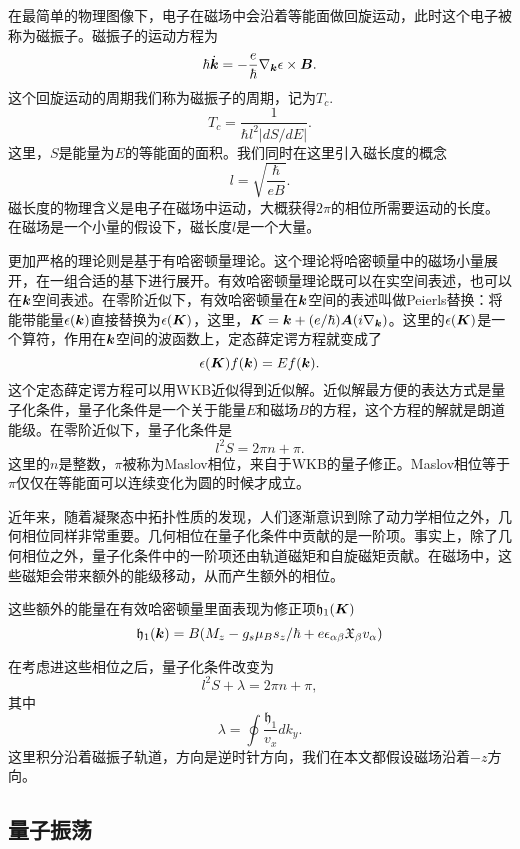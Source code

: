 在最简单的物理图像下，电子在磁场中会沿着等能面做回旋运动，此时这个电子被称为磁振子。磁振子的运动方程为
\begin{equation}
\hbar\dot{\boldsymbol{k}}=-\frac{e}{\hbar}\nabla_{\boldsymbol{k}}\epsilon\times\boldsymbol{B}.
\end{equation}
这个回旋运动的周期我们称为磁振子的周期，记为$T_c$.
\begin{equation}
T_c=\frac{1}{\hbar l^2 |dS/dE|}.
\end{equation}
这里，$S$是能量为$E$的等能面的面积。我们同时在这里引入磁长度的概念
\begin{equation}
l=\sqrt{\frac{\hbar}{eB}}.
\end{equation}
磁长度的物理含义是电子在磁场中运动，大概获得$2\pi$的相位所需要运动的长度。在磁场是一个小量的假设下，磁长度$l$是一个大量。


更加严格的理论则是基于有哈密顿量理论。这个理论将哈密顿量中的磁场小量展开，在一组合适的基下进行展开。有效哈密顿量理论既可以在实空间表述，也可以在$\boldsymbol{k}$空间表述。在零阶近似下，有效哈密顿量在$\boldsymbol{k}$空间的表述叫做Peierls替换：将能带能量$\epsilon(\boldsymbol{k})$直接替换为$\epsilon(\boldsymbol{K})$，这里，$\boldsymbol{K}=\boldsymbol{k}+(e/\hbar)\boldsymbol{A}(i\nabla_{\boldsymbol{k}})$。这里的$\epsilon(\boldsymbol{K})$是一个算符，作用在$\boldsymbol{k}$空间的波函数上，定态薛定谔方程就变成了
\begin{equation}
\epsilon(\boldsymbol{K})f(\boldsymbol{k})=Ef(\boldsymbol{k}).
\end{equation}
这个定态薛定谔方程可以用WKB近似得到近似解。近似解最方便的表达方式是量子化条件，量子化条件是一个关于能量$E$和磁场$B$的方程，这个方程的解就是朗道能级。在零阶近似下，量子化条件是
\begin{equation}
l^2 S=2\pi n+\pi.
\end{equation}
这里的$n$是整数，$\pi$被称为Maslov相位，来自于WKB的量子修正。Maslov相位等于$\pi$仅仅在等能面可以连续变化为圆的时候才成立。

近年来，随着凝聚态中拓扑性质的发现，人们逐渐意识到除了动力学相位之外，几何相位同样非常重要。几何相位在量子化条件中贡献的是一阶项。事实上，除了几何相位之外，量子化条件中的一阶项还由轨道磁矩和自旋磁矩贡献。在磁场中，这些磁矩会带来额外的能级移动，从而产生额外的相位。

这些额外的能量在有效哈密顿量里面表现为修正项$\mathfrak{h}_1(\boldsymbol{K})$
\begin{equation}
\mathfrak{h}_1(\boldsymbol{k})=B(M_z-g_s\mu_Bs_z/\hbar+e\epsilon_{\alpha\beta}\mathfrak{X}_\beta v_\alpha)
\end{equation}

在考虑进这些相位之后，量子化条件改变为
\begin{equation}
l^2 S+\lambda = 2\pi n +\pi,
\end{equation}
其中
\begin{equation}
\lambda = \oint \frac{\mathfrak{h}_1}{v_x} dk_y.
\end{equation}
这里积分沿着磁振子轨道，方向是逆时针方向，我们在本文都假设磁场沿着$-z$方向。

\subsection{量子振荡}